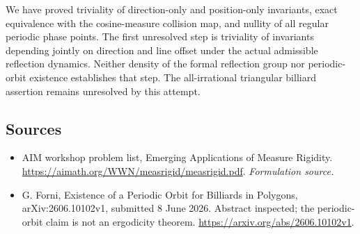 \documentclass[11pt]{article}
\begin{document}
We have proved triviality of direction-only and position-only invariants, exact equivalence with the cosine-measure collision map, and nullity of all regular periodic phase points. The first unresolved step is triviality of invariants depending jointly on direction and line offset under the actual admissible reflection dynamics. Neither density of the formal reflection group nor periodic-orbit existence establishes that step. The all-irrational triangular billiard assertion remains unresolved by this attempt.

\subsection{Sources}
\begin{itemize}
\item[S1]AIM workshop problem list, Emerging Applications of Measure Rigidity.
\url{https://aimath.org/WWN/measrigid/measrigid.pdf}.
\textit{Formulation source.}
\item[S2] G. Forni, Existence of a Periodic Orbit for Billiards in Polygons, arXiv:2606.10102v1, submitted 8 June 2026. Abstract inspected; the periodic-orbit claim is not an ergodicity theorem.
\url{https://arxiv.org/abs/2606.10102v1}.
\end{itemize}
\end{document}
